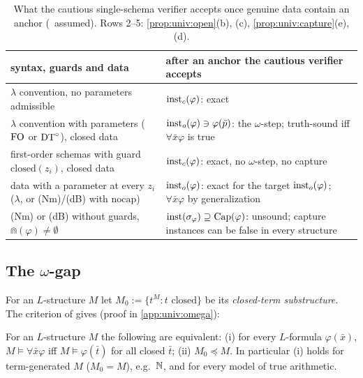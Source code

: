 \begin{table}[t]
\centering\small
\begin{tabularx}{\textwidth}{@{}>{\raggedright\arraybackslash}p{}>{\raggedright\arraybackslash}X@{}}
\toprule
syntax, guards and data & after an anchor the cautious verifier accepts\\
\midrule
$\lambda$ convention, no parameters admissible & $\mathrm{inst}_{c}(\varphi)$: exact\\
$\lambda$ convention with parameters ($\mathrm{FO}$ or $\mathrm{DT}^{\circ}$), closed data & $\mathrm{inst}_{o}(\varphi)\ni\varphi(\bar p)$: the $\omega$-step; truth-sound iff $\forall\bar x\varphi$ is true\\
first-order schemas with guard $\mathrm{closed}(z_i)$, closed data & $\mathrm{inst}_{c}(\varphi)$: exact, no $\omega$-step, no capture\\
data with a parameter at every $z_i$ ($\lambda$, or (Nm)/(dB) with $\mathrm{nocap}$) & $\mathrm{inst}_{o}(\varphi)$: exact for the target $\mathrm{inst}_{o}(\varphi)$; $\forall\bar x\varphi$ by generalization\\
(Nm) or (dB) without guards, $\Cap(\varphi)\neq\emptyset$ & $\mathrm{inst}(\sigma_\varphi)\supseteq\mathrm{Cap}(\varphi)$: unsound; capture instances can be false in every structure\\
\bottomrule
\end{tabularx}
\caption{What the cautious single-schema verifier accepts once genuine data contain an anchor (\univRich\ assumed). Rows 2--5: \cref{prop:univ:open}(b), (c), \cref{prop:univ:capture}(e), (d).}
\label{tab:univ:learner}
\end{table}

\subsection{The \texorpdfstring{$\omega$}{omega}-gap}\label{sec:univ:omega}

For an $L$-structure $M$ let $M_0:=\{t^M:t\text{ closed}\}$ be its \emph{closed-term substructure}. The criterion of \citet{tarski1957arithmetical} gives (proof in \cref{app:univ:omega}):

\begin{proposition}\label{prop:univ:tv}
For an $L$-structure $M$ the following are equivalent: \textup{(i)} for every $L$-formula $\varphi(\bar x)$, $M\models\forall\bar x\varphi$ iff $M\models\varphi(\bar t)$ for all closed $\bar t$; \textup{(ii)} $M_0\preceq M$. In particular (i) holds for term-generated $M$ ($M_0=M$), e.g.\ $\mathbb{N}$, and for every model of true arithmetic.
\end{proposition}

